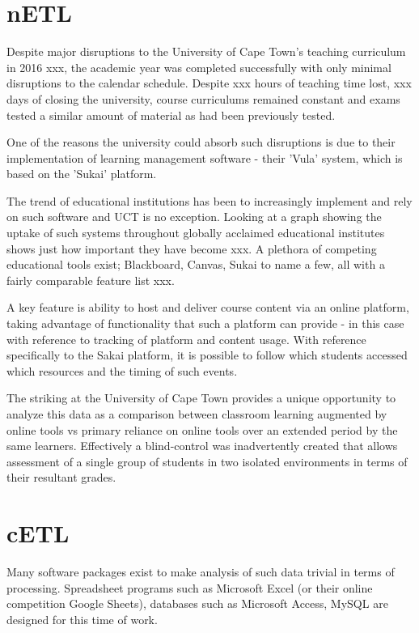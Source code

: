 \documentclass[parskip=full]{scrartcl}
\begin{document}
\section{nETL}
Despite major disruptions to the University of Cape Town's teaching curriculum in 2016 xxx, the academic year was completed successfully with only minimal disruptions to the calendar schedule. Despite xxx hours of teaching time lost, xxx days of closing the university, course curriculums remained constant and exams tested a similar amount of material as had been previously tested.

One of the reasons the university could absorb such disruptions is due to their implementation of learning management software - their 'Vula' system, which is based on the 'Sukai' platform.

The trend of educational institutions has been to increasingly implement and rely on such software and UCT is no exception. Looking at a graph showing the uptake of such systems throughout globally acclaimed educational institutes shows just how important they have become xxx. A plethora of competing educational tools exist; Blackboard, Canvas, Sukai to name a few, all with a fairly comparable feature list xxx.

A key feature is ability to host and deliver course content via an online platform, taking advantage of functionality that such a platform can provide - in this case with reference to tracking of platform and content usage. With reference specifically to the Sakai platform, it is possible to follow which students accessed which resources and the timing of such events.

The striking at the University of Cape Town provides a unique opportunity to analyze this data as a comparison between classroom learning augmented by online tools vs primary reliance on online tools over an extended period by the same learners. Effectively a blind-control was inadvertently created that allows assessment of a single group of students in two isolated environments in terms of their resultant grades.

\section{cETL}
Many software packages exist to make analysis of such data trivial in terms of processing. Spreadsheet programs such as Microsoft Excel (or their online competition Google Sheets), databases such as Microsoft Access, MySQL are designed for this time of work.
\end{document}
